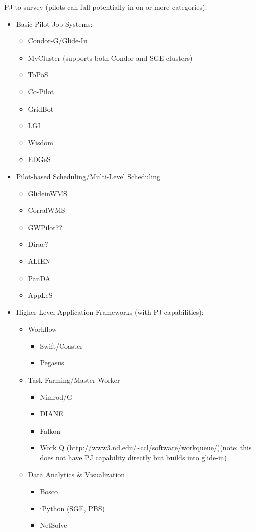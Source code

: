 \documentclass{sig-alternate}
\begin{document}
PJ to survey (pilots can fall potentially in on or more categories):
\begin{itemize}
	\item Basic Pilot-Job Systems: 
	\begin{itemize}
		\item Condor-G/Glide-In
		\item MyCluster (supports both Condor and SGE clusters)
		\item ToPoS 
		\item Co-Pilot
		\item GridBot~\cite{Silberstein:2009:GEB:1654059.1654071}
		\item LGI
		\item Wisdom
		\item EDGeS
	\end{itemize}
	\item Pilot-based Scheduling/Multi-Level Scheduling
	\begin{itemize}
		\item GlideinWMS~\cite{1742-6596-119-6-062044}
		\item CorralWMS
		\item GWPilot??
		\item Dirac?
        \item ALIEN
		\item PanDA  
		\item AppLeS
	\end{itemize}
	\item Higher-Level Application Frameworks (with PJ capabilities):
	\begin{itemize}
		\item Workflow
		\begin{itemize}
			\item Swift/Coaster
			\item Pegasus
		\end{itemize}
		\item Task Farming/Master-Worker
		\begin{itemize}
			\item Nimrod/G 
			\item DIANE
			\item Falkon 
            \item Work Q (\url{http://www3.nd.edu/~ccl/software/workqueue/})(note: this does not have PJ capability directly but builds into glide-in)
		\end{itemize}
		\item Data Analytics \& Visualization
		\begin{itemize}
			\item Bosco
			\item iPython (SGE, PBS)
			\item NetSolve~\cite{Casanova:1995:NNS:898848}
		\end{itemize}
	\end{itemize}
\end{itemize}
\end{document}
